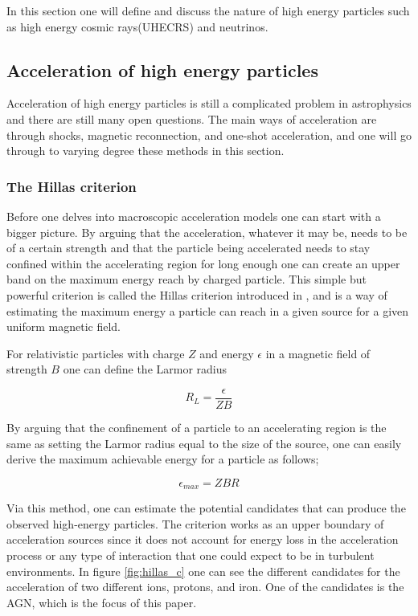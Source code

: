 In this section one will define and discuss the nature of high energy particles such as high energy cosmic rays(UHECRS) and neutrinos. 

\subsection{Acceleration of high energy particles}
Acceleration of high energy particles is still a complicated problem in astrophysics and there are still many open questions. The main ways of acceleration are through shocks, magnetic reconnection, and one-shot acceleration, and one will go through to varying degree these methods in this section. 

\subsubsection{The Hillas criterion}


Before one delves into macroscopic acceleration models one can start with a bigger picture. By arguing that the acceleration, whatever it may be, needs to be of a certain strength and that the particle being accelerated needs to stay confined within the accelerating region for long enough one can create an upper band on the maximum energy reach by charged particle.
This simple but powerful criterion is called the Hillas criterion introduced in \cite{Hillas_1984}, and is a way of estimating the maximum energy a particle can reach in a given source for a given uniform magnetic field.%

For relativistic particles with charge $Z$ and energy $\epsilon$ in a magnetic field of strength $B$ one can define the Larmor radius


\begin{equation}
    R_L = \frac{\epsilon}{ZB}
\end{equation}

By arguing that the confinement of a particle to an accelerating region is the same as setting the Larmor radius equal to the size of the source, one can 
easily derive the maximum achievable energy for a particle as follows;%

\begin{equation}
    \epsilon_{max} = ZBR
\end{equation}

Via this method, one can estimate the potential candidates that can produce the observed high-energy particles. 
The criterion works as an upper boundary of acceleration sources since it does not account for energy loss in the acceleration process or any type of interaction that one could expect to be in turbulent environments.
In figure \ref{fig:hillas_c} one can see the different candidates for the acceleration of two different ions, protons, and iron. One of the candidates is the AGN, which is the focus of this paper.

